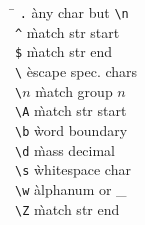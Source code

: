 \begin{multicols}{2}
\begin{tabbing}
\hspace{2em}\= \kill
\' \verb#.# \` any char but \verb.\n. \\ 
\' \verb#^# \` match str start \\ 
\' \verb#$# \` match str end \\ 
\' \verb#\# \` escape spec. chars \\
\' \verb#\#$n$ \` match group $n$ \\
\' \verb#\A# \` match str start \\
\' \verb#\b# \` word boundary \\
\' \verb#\d# \` mass decimal \\
\' \verb#\s# \` whitespace char \\
\' \verb#\w# \` alphanum or \_ \\
\' \verb#\Z# \` match str end \\
\end{tabbing}
\end{multicols}
\vspace{-1.6em}
